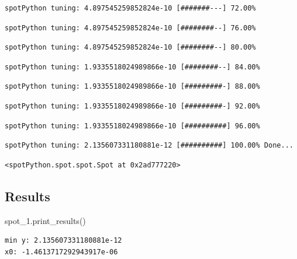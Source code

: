 \documentclass[
  letterpaper,
  DIV=11,
  numbers=noendperiod]{scrreprt}
\newenvironment{Shaded}{\begin{snugshade}}{\end{snugshade}}
\newcommand{\NormalTok}[1]{\textcolor[rgb]{0.00,0.23,0.31}{#1}}
\begin{document}
\begin{verbatim}
spotPython tuning: 4.897545259852824e-10 [#######---] 72.00% 
\end{verbatim}

\begin{verbatim}
spotPython tuning: 4.897545259852824e-10 [########--] 76.00% 
\end{verbatim}

\begin{verbatim}
spotPython tuning: 4.897545259852824e-10 [########--] 80.00% 
\end{verbatim}

\begin{verbatim}
spotPython tuning: 1.9335518024989866e-10 [########--] 84.00% 
\end{verbatim}

\begin{verbatim}
spotPython tuning: 1.9335518024989866e-10 [#########-] 88.00% 
\end{verbatim}

\begin{verbatim}
spotPython tuning: 1.9335518024989866e-10 [#########-] 92.00% 
\end{verbatim}

\begin{verbatim}
spotPython tuning: 1.9335518024989866e-10 [##########] 96.00% 
\end{verbatim}

\begin{verbatim}
spotPython tuning: 2.135607331180881e-12 [##########] 100.00% Done...
\end{verbatim}

\begin{verbatim}
<spotPython.spot.spot.Spot at 0x2ad777220>
\end{verbatim}

\hypertarget{results-3}{%
\subsection{Results}\label{results-3}}

\begin{Shaded}
\begin{Highlighting}[]
\NormalTok{spot\_1.print\_results()}
\end{Highlighting}
\end{Shaded}

\begin{verbatim}
min y: 2.135607331180881e-12
x0: -1.4613717292943917e-06
\end{verbatim}
\end{document}
